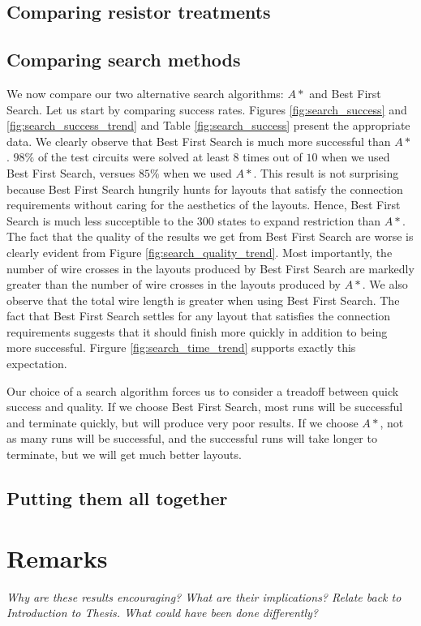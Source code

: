 \subsection{Comparing resistor treatments}

\subsection{Comparing search methods}

We now compare our two alternative search algorithms: $A*$ and Best First Search.
Let us start by comparing success rates. Figures \ref{fig:search_success} and
\ref{fig:search_success_trend} and Table \ref{fig:search_success} present the
appropriate data. We clearly observe that Best First Search is much more
successful than $A*$. $98\%$ of the test circuits were solved at least $8$ times
out of $10$ when we used Best First Search, versues $85\%$ when we used $A*$.
This result is not surprising because Best First Search hungrily hunts for
layouts that satisfy the connection requirements without caring for the
aesthetics of the layouts. Hence, Best First Search is much less succeptible to
the $300$ states to expand restriction than $A*$. The fact that the quality of
the results we get from Best First Search are worse
is clearly evident from Figure \ref{fig:search_quality_trend}. Most importantly, the
number of wire crosses in the layouts produced by Best First Search are markedly
greater than the number of wire crosses in the layouts produced by $A*$. We also
observe that the total wire length is greater when using Best First Search. The
fact that Best First Search settles for any layout that satisfies the connection
requirements suggests that it should finish more quickly in addition to being
more successful. Firgure \ref{fig:search_time_trend} supports exactly this
expectation.

Our choice of a search algorithm forces us to consider a treadoff between quick
success and quality. If we choose Best First Search, most runs will be successful
and terminate quickly, but will produce very poor results. If we choose $A*$,
not as many runs will be successful, and the successful runs will take longer to
terminate, but we will get much better layouts.

\subsection{Putting them all together}
\label{sec:method_combination}

\section{Remarks}

\textit{Why are these results encouraging? What are their implications? Relate
back to Introduction to Thesis. What could have been done differently?}
